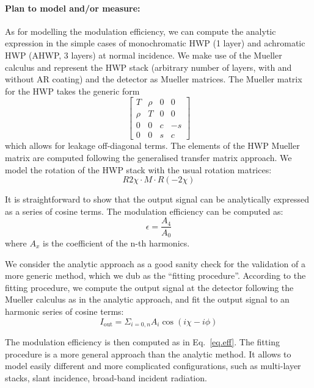 \paragraph{Plan to model and/or measure:}
As for modelling the modulation efficiency, we can compute the analytic expression in the simple cases of monochromatic HWP (1 layer) and achromatic HWP (AHWP, 3 layers) at normal incidence. We make use of the Mueller calculus and represent the HWP stack (arbitrary number of layers, with and without AR coating) and the detector as Mueller matrices. The Mueller matrix for the HWP takes the generic form 
\begin{equation}
\begin{bmatrix}
   T  &\rho  &0  &0\\
   \rho  &T  &0  &0\\
   0  &0  &c  &-s\\
   0  &0  &s  &c
\end{bmatrix}
\end{equation}
which allows for leakage off-diagonal terms. The elements of the HWP Mueller matrix are computed following the generalised transfer matrix approach. We model the rotation of the HWP stack with the usual rotation matrices:
\begin{equation}
R{2\chi}\cdot M \cdot R(-2\chi)
\end{equation}

It is straightforward to show that the output signal can be analytically expressed as a series of cosine terms. The modulation efficiency can be computed as:
\begin{equation}\label{eq:eff}
\epsilon=\frac{A_4}{A_0}
\end{equation}
where $A_x$ is the coefficient of the n-th harmonics.

We consider the analytic approach as a good sanity check for the validation of a more generic method, which we dub as the ``fitting procedure''. According to the fitting procedure, we compute the output signal at the detector following the Mueller calculus as in the analytic approach, and fit the output signal to an harmonic series of cosine terms:
\begin{equation}
I_\mathrm{out}=\Sigma_{i=0,n} A_i \cos(i\chi-i\phi)
\end{equation}

The modulation efficiency is then computed as in Eq.~\ref{eq.eff}. The fitting procedure is a more general approach than the analytic method. It allows to model easily different and more complicated configurations, such as multi-layer stacks, slant incidence, broad-band incident radiation.

